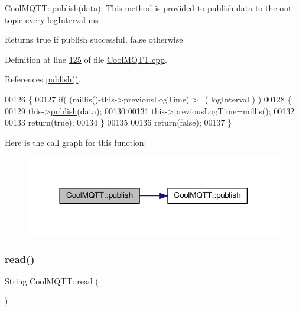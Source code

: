 Cool\+M\+Q\+T\+T\+::publish(data)\+: This method is provided to publish data to the out topic every log\+Interval ms

\begin{DoxyReturn}{Returns}
true if publish successful, false otherwise 
\end{DoxyReturn}


Definition at line \hyperlink{_cool_m_q_t_t_8cpp_source_l00125}{125} of file \hyperlink{_cool_m_q_t_t_8cpp_source}{Cool\+M\+Q\+T\+T.\+cpp}.



References \hyperlink{_cool_m_q_t_t_8cpp_source_l00102}{publish()}.


\begin{DoxyCode}
00126 \{
00127     \textcolor{keywordflow}{if}( (millis()-this->previousLogTime) >=( logInterval ) )
00128     \{
00129         this->\hyperlink{class_cool_m_q_t_t_ace977b3e90ab14b1199fe5c4fb0a13ec}{publish}(data);
00130 
00131         this->previousLogTime=millis();
00132 
00133         \textcolor{keywordflow}{return}(\textcolor{keyword}{true});
00134     \}
00135     
00136     \textcolor{keywordflow}{return}(\textcolor{keyword}{false});
00137 \}
\end{DoxyCode}
Here is the call graph for this function\+:
\nopagebreak
\begin{figure}[H]
\begin{center}
\leavevmode
\includegraphics[width=318pt]{class_cool_m_q_t_t_a65a506641740ce797ceadd4fa8a286d3_cgraph}
\end{center}
\end{figure}
\mbox{\label{class_cool_m_q_t_t_ae3c18f6ae9723746d32765f1c8f176ca}} 
\subsubsection{\texorpdfstring{read()}{read()}}
{\footnotesize\ttfamily String Cool\+M\+Q\+T\+T\+::read (\begin{DoxyParamCaption}{ }\end{DoxyParamCaption})}

